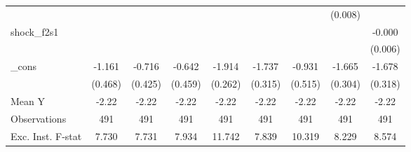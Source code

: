 {\begin{tabular}{l*{8}{c}}
            &                     &                     &                     &                     &                     &                     &     (0.008)         &                     \\
\addlinespace
shock\_f2s1  &                     &                     &                     &                     &                     &                     &                     &      -0.000         \\
            &                     &                     &                     &                     &                     &                     &                     &     (0.006)         \\
\addlinespace
\_cons      &      -1.161\sym{**} &      -0.716         &      -0.642         &      -1.914\sym{***}&      -1.737\sym{***}&      -0.931\sym{*}  &      -1.665\sym{***}&      -1.678\sym{***}\\
            &     (0.468)         &     (0.425)         &     (0.459)         &     (0.262)         &     (0.315)         &     (0.515)         &     (0.304)         &     (0.318)         \\
\midrule
Mean Y      &       -2.22         &       -2.22         &       -2.22         &       -2.22         &       -2.22         &       -2.22         &       -2.22         &       -2.22         \\
Observations&         491         &         491         &         491         &         491         &         491         &         491         &         491         &         491         \\
Exc. Inst. F-stat&       7.730         &       7.731         &       7.934         &      11.742         &       7.839         &      10.319         &       8.229         &       8.574         \\
\bottomrule
\end{tabular}
}
